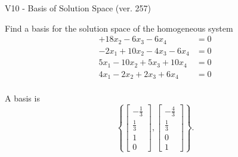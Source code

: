 \begin{exercise}
  \begin{exerciseTitle}V10 - Basis of Solution Space (ver. 257)\end{exerciseTitle}
  \begin{exerciseStatement}
    Find a basis for the solution space of the homogeneous system 
\begin{align*}
 + 18 x_ 2 -6 x_ 3 -6 x_ 4 &= 0  \\ 
  -2 x_ 1 + 10 x_ 2 -4 x_ 3 -6 x_ 4 &= 0  \\ 
  5 x_ 1 -10 x_ 2 + 5 x_ 3 + 10 x_ 4 &= 0  \\ 
  4 x_ 1 -2 x_ 2 + 2 x_ 3 + 6 x_ 4 &= 0  \\ 
 \end{align*}


 
  \end{exerciseStatement}

  \begin{exerciseAnswer}
   A basis is   
\[\left\{\left[\begin{array}{c}
-\frac{1}{3} \\
\frac{1}{3} \\
1 \\
0
\end{array}\right] , \left[\begin{array}{c}
-\frac{4}{3} \\
\frac{1}{3} \\
0 \\
1
\end{array}\right]\right\}.\]

  


  \end{exerciseAnswer}
\end{exercise}
